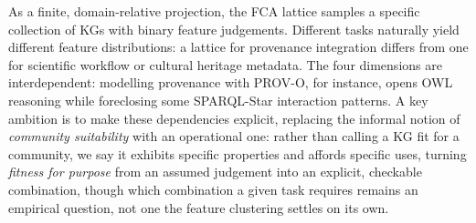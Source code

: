 \documentclass[runningheads]{llncs}
\newenvironment{onlyshort}{\ignorespaces}{\ignorespacesafterend}
\begin{document}
\begin{onlyshort}
%
As a finite, domain-relative projection, the FCA lattice samples a specific collection of KGs with binary feature judgements. 
Different tasks naturally yield different feature distributions: a lattice for provenance integration differs from one for scientific workflow or cultural heritage metadata.
The four dimensions are interdependent: modelling provenance with PROV-O, for instance, opens OWL reasoning while foreclosing some SPARQL-Star interaction patterns.
A key ambition is to make these dependencies explicit, replacing the informal notion of \emph{community suitability} with an operational one: rather than calling a KG fit for a community, we say it exhibits specific properties and affords specific uses, turning \emph{fitness for purpose} from an assumed judgement into an explicit, checkable combination, though which combination a given task requires remains an empirical question, not one the feature clustering settles on its own.


\end{onlyshort}
\end{document}

